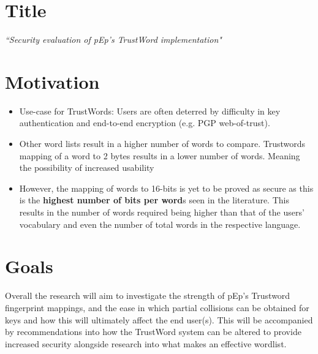 \section{Title}

\begin{center}
    \textit{\large ``Security evaluation of pEp's TrustWord implementation"}
\end{center}

\section{Motivation}
\begin{itemize}
    \item Use-case for TrustWords: Users are often deterred by difficulty in key authentication and end-to-end encryption (e.g. PGP web-of-trust).

    \item Other word lists result in a higher number of words to compare. Trustwords mapping of a word to 2 bytes results in a lower number of words. Meaning the possibility of increased usability

    \item However, the mapping of words to 16-bits is yet to be proved as secure as this is the \textbf{highest number of bits per word}s seen in the literature. This results in the number of words required being higher than that of the users' vocabulary and even the number of total words in the respective language.
    
\end{itemize}

\section{Goals}

Overall the research will aim to investigate the strength of pEp's Trustword fingerprint mappings, and the ease in which partial collisions can be obtained for keys and how this will ultimately affect the end user(s). This will be accompanied by recommendations into how the TrustWord system can be altered to provide increased security alongside research into what makes an effective wordlist.

\newpage
